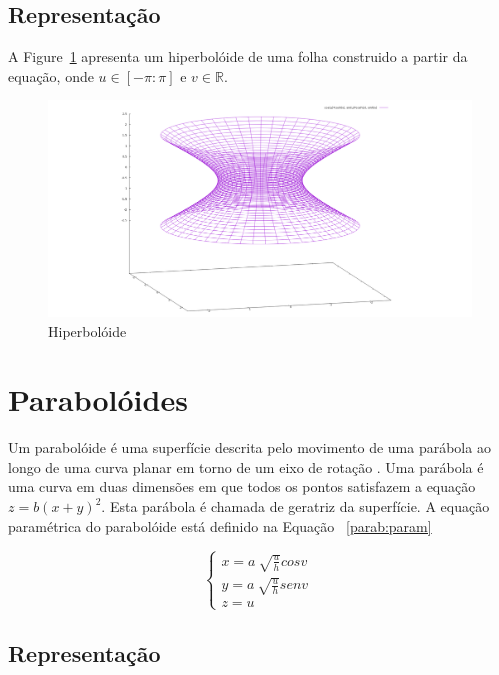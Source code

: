\documentclass[
	article,			%
	11pt,				%
	oneside,			%
	a4paper,			%
	english,			%
	brazil,				%
	]{abntex2}
\begin{document}
		\subsection{Representação}

		A Figure~\ref{img:hip} apresenta um hiperbolóide de uma folha construido a partir da
		equação, onde $u \in[-\pi:\pi]$ e $v\in\mathbb{R}$.

		\begin{figure}[H]
			\includegraphics[width=\textwidth,keepaspectratio]{hyperboloid.png}
			\caption{Hiperbolóide}
			\label{img:hip}
		\end{figure}

	\section{Parabolóides}

		Um parabolóide é uma superfície descrita pelo movimento de uma parábola
		ao longo de uma curva planar em torno de um eixo de rotação . Uma
		parábola é uma curva em duas dimensões em que todos os pontos satisfazem
		a equação $z = b(x+y)^2$. Esta parábola é chamada de geratriz da
		superfície. A equação paramétrica do parabolóide está definido na
		Equação ~\ref{parab:param}

		\begin{equation}\label{parab:param}
			\begin{cases}
				x = a\ \sqrt{\frac{u}{h}} cos v~\\
				y = a\ \sqrt{\frac{u}{h}} sen v~\\
				z = u
			\end{cases}
		\end{equation}

		\subsection{Representação}
\end{document}
